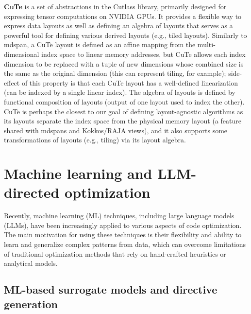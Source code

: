 \textbf{CuTe} is a set of \cpp abstractions in the Cutlass library, primarily designed for expressing tensor computations on NVIDIA GPUs\@. It provides a flexible way to express data layouts as well as defining an algebra of layouts that serves as a powerful tool for defining various derived layouts (e.g., tiled layouts). Similarly to mdspan, a CuTe layout is defined as an affine mapping from the multi-dimensional index space to linear memory addresses, but CuTe allows each index dimension to be replaced with a tuple of new dimensions whose combined size is the same as the original dimension (this can represent tiling, for example); side-effect of this property is that each CuTe layout has a well-defined linearization (can be indexed by a single linear index). The algebra of layouts is defined by functional composition of layouts (output of one layout used to index the other). CuTe is perhaps the closest to our goal of defining layout-agnostic algorithms as its layouts separate the index space from the physical memory layout (a feature shared with mdspans and Kokkos/RAJA views), and it also supports some transformations of layouts (e.g., tiling) via its layout algebra.


\section{Machine learning and LLM-directed optimization}\label{sec:ml-directed-optimization}

Recently, machine learning (ML) techniques, including large language models (LLMs), have been increasingly applied to various aspects of code optimization. The main motivation for using these techniques is their flexibility and ability to learn and generalize complex patterns from data, which can overcome limitations of traditional optimization methods that rely on hand-crafted heuristics or analytical models.


\subsection{ML-based surrogate models and directive generation}\label{sec:ml-surrogate-models}

